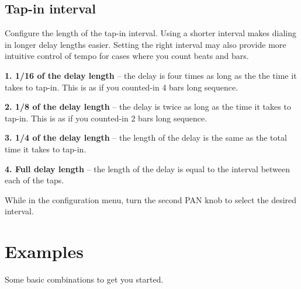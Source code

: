 \documentclass[11pt]{article}
\begin{document}
\begin{minipage}{0.05\textwidth}
\phantom{ }
\end{minipage}%
\begin{minipage}[t]{0.45\textwidth}
\setlength{\parskip}{6pt}

\subsection{Tap-in interval} \label{section:configure-tap-interval}

Configure the length of the tap-in interval. Using a shorter interval
makes dialing in longer delay lengths easier. Setting the right interval
may also provide more intuitive control of tempo for cases where you count
beats and bars.

\textbf{1. 1/16 of the delay length} -- the delay is four times as long as the
  the time it takes to tap-in. This is as if you counted-in 4 bars long
  sequence.

\textbf{2. 1/8 of the delay length} -- the delay is twice as long as the time
  it takes to tap-in. This is as if you counted-in 2 bars long sequence.

\textbf{3. 1/4 of the delay length} -- the length of the delay is the same as
  the total time it takes to tap-in.

\textbf{4. Full delay length} -- the length of the delay is equal to the
  interval between each of the taps.

While in the configuration menu, turn the second PAN knob to select the desired
interval.

\end{minipage}

\newpage
\section{Examples}

Some basic combinations to get you started.
\end{document}
